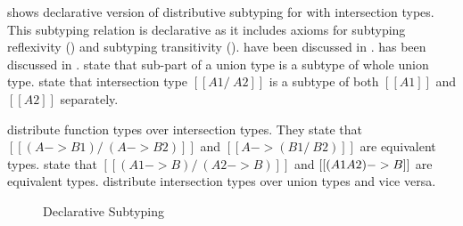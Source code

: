 
 shows declarative version of distributive subtyping for \cal with intersection types.
This subtyping relation is declarative as it includes axioms for subtyping reflexivity () and
subtyping transitivity ().  have been
discussed in .  has been discussed in .
 state that sub-part of a union type is a subtype of whole union type.
 state that intersection type $[[A1 /\ A2]]$ is a subtype of both $[[A1]]$
and $[[A2]]$ separately.

  distribute function types over intersection types.
They state that $[[(A -> B1) /\ (A -> B2)]]$ and $[[A -> (B1 /\ B2)]]$ are equivalent types.
 state that $[[(A1 -> B) /\ (A2 -> B)]]$ and $[[(A1 \/ A2) -> B]]$
are equivalent types.
 distribute intersection types over union types and vice versa.


\begin{figure}[t]
  \caption{Declarative Subtyping}
  \label{fig:discussion:ds}
\end{figure}